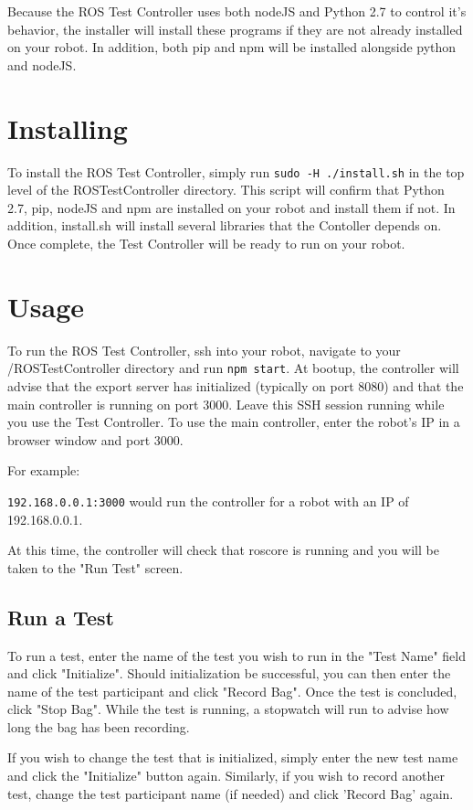 \documentclass[onecolumn, draftclsnofoot,10pt, compsoc]{report}
\begin{document}
Because the ROS Test Controller uses both nodeJS and Python 2.7 to control it's behavior, the installer will install these programs if they are not already installed on your robot. In addition, both pip and npm will be installed alongside python and nodeJS.
\section{Installing}

To install the ROS Test Controller, simply run \texttt{sudo -H ./install.sh} in the top level of the ROSTestController directory. This script will confirm that Python 2.7, pip, nodeJS and npm are installed on your robot and install them if not. In addition, install.sh will install several libraries that the Contoller depends on. Once complete, the Test Controller will be ready to run on your robot.
\section{Usage}

To run the ROS Test Controller, ssh into your robot, navigate to your /ROSTestController directory and run \texttt{npm start}. At bootup, the controller will advise that the export server has initialized (typically on port 8080) and that the main controller is running on port 3000. Leave this SSH session running while you use the Test Controller. To use the main controller, enter the robot's IP in a browser window and port 3000.

For example:

\texttt{192.168.0.0.1:3000} would run the controller for a robot with an IP of 192.168.0.0.1.

At this time, the controller will check that roscore is running and you will be taken to the "Run Test" screen.
\subsection{Run a Test}

To run a test, enter the name of the test you wish to run in the "Test Name" field and click "Initialize". Should initialization be successful, you can then enter the name of the test participant and click "Record Bag". Once the test is concluded, click "Stop Bag". While the test is running, a stopwatch will run to advise how long the bag has been recording.

If you wish to change the test that is initialized, simply enter the new test name and click the "Initialize" button again. Similarly, if you wish to record another test, change the test participant name (if needed) and click 'Record Bag' again.
\end{document}
